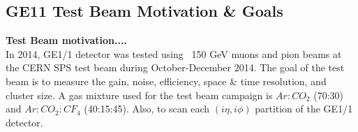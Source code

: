 
\subsection{GE11 Test Beam Motivation \& Goals}
\textbf{Test Beam motivation....}\\
In 2014, GE1/1 detector was tested using ~150 GeV muons and pion beams at the CERN SPS test beam during October-December 2014.
The goal of the test beam is to measure the gain, noise, efficiency, space \& time resolution, and cluster size.
A gas mixture used for the test beam campaign is $Ar:CO_{2}$ (70:30) and $Ar:CO_{2}:CF_{4}$ (40:15:45). Also, to scan each $(i\eta,i\phi)$ partition of the GE1/1 detector.


